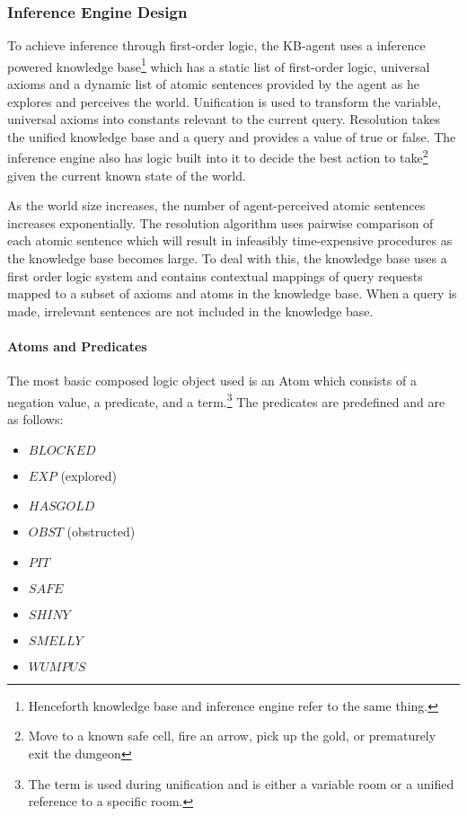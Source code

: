 \subsubsection{Inference Engine Design} \label{subsubsec:inference engine}
To achieve inference through first-order logic, the KB-agent uses a inference powered knowledge base\footnote{Henceforth knowledge base and inference engine refer to the same thing.}  which has a static list of first-order logic, universal axioms and a dynamic list of atomic sentences provided by the agent as he explores and perceives the world. 
Unification is used to transform the variable, universal axioms into constants relevant to the current query.
Resolution takes the unified knowledge base and a query and provides a value of true or false.
The inference engine also has logic built into it to decide the best action to take\footnote{Move to a known safe cell, fire an arrow, pick up the gold, or prematurely exit the dungeon} given the current known state of the world.

As the world size increases, the number of agent-perceived atomic sentences increases exponentially.
The resolution algorithm uses pairwise comparison of each atomic sentence which will result in infeasibly time-expensive procedures as the knowledge base becomes large.
To deal with this, the knowledge base uses a first order logic system and contains contextual mappings of query requests mapped to a subset of axioms and atoms in the knowledge base.
When a query is made, irrelevant sentences are not included in the knowledge base.

\paragraph{Atoms and Predicates}
The most basic composed logic object used is an Atom which consists of a negation value, a predicate, and a term.\footnote{The term is used during unification and is either a variable room or a unified reference to a specific room.}
The predicates are predefined and are as follows:
\begin{multicols}{3}
\begin{itemize}
	\item $BLOCKED$
    \item $EXP$ (explored)
    \item $HASGOLD$
    \item $OBST$ (obstructed)
    \item $PIT$
    \item $SAFE$
    \item $SHINY$
    \item $SMELLY$
    \item $WUMPUS$
\end{itemize}
\end{multicols}


